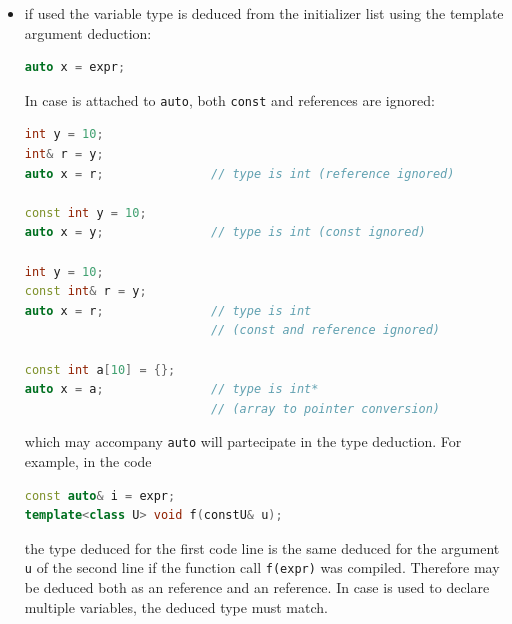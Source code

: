\begin{itemize}
    \item if used  the variable 
    type is deduced from the initializer list using the template 
    argument deduction:
    \begin{lstlisting}[language=C++]
auto x = expr;
    \end{lstlisting}
    In case  is 
    attached to \texttt{auto}, both \texttt{const} and references are 
    ignored:
    \begin{lstlisting}[language=C++]
int y = 10;
int& r = y;
auto x = r;               // type is int (reference ignored)

const int y = 10;
auto x = y;               // type is int (const ignored)

int y = 10;
const int& r = y;
auto x = r;               // type is int
                          // (const and reference ignored)

const int a[10] = {};
auto x = a;               // type is int*
                          // (array to pointer conversion)
    \end{lstlisting}

 which may accompany \texttt{auto} will partecipate in the 
type deduction. For example, in the code
    \begin{lstlisting}[language=C++]
const auto& i = expr;
template<class U> void f(constU& u);
    \end{lstlisting}
    the type deduced for the first code line is the same deduced for 
    the argument \texttt{u} of the second line if the function call 
    \texttt{f(expr)} was compiled.
    \newline
    Therefore  may be deduced both as an 
     reference and an  reference.
    \newline
    In case  is used to declare multiple variables, the 
    deduced type must match.
    

\end{itemize}

